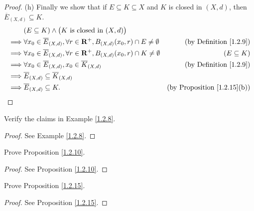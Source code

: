 \begin{proof}{(h)}
    Finally we show that if \(E \subseteq K \subseteq X\) and \(K\) is closed in \((X, d)\), then \(\overline{E}_{(X, d)} \subseteq K\).
    \begin{align*}
                 & (E \subseteq K) \land \big(K \text{ is closed in } (X, d)\big)                                                                                \\
        \implies & \forall x_0 \in \overline{E}_{(X, d)}, \forall r \in \mathbf{R}^+, B_{(X, d)}(x_0, r) \cap E \neq \emptyset & \text{(by Definition \ref{1.2.9})}      \\
        \implies & \forall x_0 \in \overline{E}_{(X, d)}, \forall r \in \mathbf{R}^+, B_{(X, d)}(x_0, r) \cap K \neq \emptyset & (E \subseteq K)                         \\
        \implies & \forall x_0 \in \overline{E}_{(X, d)}, x_0 \in \overline{K}_{(X, d)}                                & \text{(by Definition \ref{1.2.9})}      \\
        \implies & \overline{E}_{(X, d)} \subseteq \overline{K}_{(X, d)}                                                                                         \\
        \implies & \overline{E}_{(X, d)} \subseteq K.                                                                  & \text{(by Proposition \ref{1.2.15}(b))}
    \end{align*}
\end{proof}

\exercisesection

\begin{exercise}\label{ex 1.2.1}
    Verify the claims in Example \ref{1.2.8}.
\end{exercise}

\begin{proof}
    See Example \ref{1.2.8}.
\end{proof}

\begin{exercise}\label{ex 1.2.2}
    Prove Proposition \ref{1.2.10}.
\end{exercise}

\begin{proof}
    See Proposition \ref{1.2.10}.
\end{proof}

\begin{exercise}\label{ex 1.2.3}
    Prove Proposition \ref{1.2.15}.
\end{exercise}

\begin{proof}
    See Proposition \ref{1.2.15}.
\end{proof}

